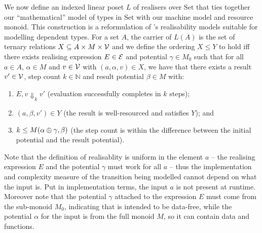 \documentclass[acmsmall,screen]{acmart}
\newcommand{\Set}{\mathrm{Set}}
\begin{document}
We now define an indexed linear poset $L$ of realisers over $\Set$
that ties together our ``mathematical'' model of types in $\Set$ with
our machine model and resource monoid. This construction is a
reformulation of \citet{dallago11realisability}'s realisability models
suitable for modelling dependent types. For a set $A$, the carrier of
$L(A)$ is the set of ternary relations
$X \subseteq A \times M \times \mathcal{V}$ and we define the ordering
$X \leq Y$ to hold iff there exists realising expression
$E \in \mathcal{E}$ and potential $\gamma \in M_0$ such that for all
$a \in A$, $\alpha \in M$ and $v \in \mathcal{V}$ with
$(a,\alpha,v) \in X$, we have that there exists a result
$v' \in \mathcal{V}$, step count $k \in \mathbb{N}$ and result potential
$\beta \in M$ with:
\begin{enumerate}
\item $E, v \Downarrow_k v'$ (evaluation successfully completes in $k$ steps);
\item $(a, \beta, v') \in Y$ (the result is well-resourced and
  satisfies $Y$); and
\item $k \leq M(\alpha \oplus \gamma, \beta)$ (the step count is within the
  difference between the initial potential and the result potential).
\end{enumerate}
Note that the definition of realisablity is uniform in the element $a$
-- the realising expression $E$ and the potential $\gamma$ must work
for all $a$ -- thus the implementation and complexity measure of the
transition being modelled cannot depend on what the input is. Put in
implementation terms, the input $a$ is not present at
runtime. Moreover note that the potential $\gamma$ attached to the
expression $E$ must come from the sub-monoid $M_0$, indicating that is
intended to be data-free, while the potential $\alpha$ for the input
is from the full monoid $M$, so it can contain data and functions.
\end{document}
